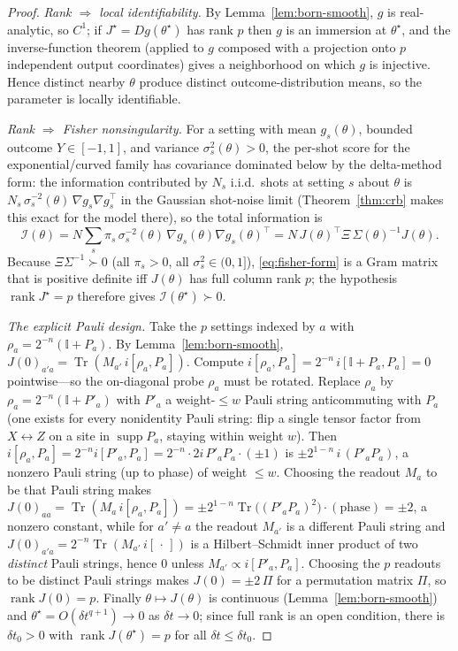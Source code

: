 \documentclass[aps,prresearch,reprint,superscriptaddress,nofootinbib,amsmath,amssymb]{revtex4-2}
\newcommand{\Tr}{\operatorname{Tr}}
\newcommand{\supp}{\operatorname{supp}}
\newcommand{\id}{\mathbb{I}}
\newcommand{\dt}{\delta t}
\begin{document}
\begin{proof}
\emph{Rank $\Rightarrow$ local identifiability.} By Lemma~\ref{lem:born-smooth}, $g$ is real-analytic, so $C^1$; if $J^\star=Dg(\theta^\star)$ has rank $p$ then $g$ is an immersion at $\theta^\star$, and the inverse-function theorem (applied to $g$ composed with a projection onto $p$ independent output coordinates) gives a neighborhood on which $g$ is injective. Hence distinct nearby $\theta$ produce distinct outcome-distribution means, so the parameter is locally identifiable.

\emph{Rank $\Rightarrow$ Fisher nonsingularity.} For a setting with mean $g_s(\theta)$, bounded outcome $Y\in[-1,1]$, and variance $\sigma_s^2(\theta)>0$, the per-shot score for the exponential/curved family has covariance dominated below by the delta-method form: the information contributed by $N_s$ i.i.d.\ shots at setting $s$ about $\theta$ is $N_s\,\sigma_s^{-2}(\theta)\,\nabla g_s\nabla g_s^\top$ in the Gaussian shot-noise limit (Theorem~\ref{thm:crb} makes this exact for the model there), so the total information is
\begin{equation}
    \mathcal{I}(\theta)=N\sum_{s}\pi_s\,\sigma_s^{-2}(\theta)\,\nabla g_s(\theta)\nabla g_s(\theta)^\top=N\,J(\theta)^\top\Xi\,\Sigma(\theta)^{-1}J(\theta).
    \label{eq:fisher-form}
\end{equation}
Because $\Xi\Sigma^{-1}\succ0$ (all $\pi_s>0$, all $\sigma_s^2\in(0,1]$), \eqref{eq:fisher-form} is a Gram matrix that is positive definite iff $J(\theta)$ has full column rank $p$; the hypothesis $\operatorname{rank}J^\star=p$ therefore gives $\mathcal{I}(\theta^\star)\succ0$.

\emph{The explicit Pauli design.} Take the $p$ settings indexed by $a$ with $\rho_a=2^{-n}(\id+P_a)$. By Lemma~\ref{lem:born-smooth}, $J(0)_{a'a}=\Tr(M_{a'}\,i[\rho_a,P_a])$. Compute $i[\rho_a,P_a]=2^{-n}\,i[\id+P_a,P_a]=0$ pointwise---so the on-diagonal probe $\rho_a$ must be rotated. Replace $\rho_a$ by $\rho_a=2^{-n}(\id+P'_a)$ with $P'_a$ a weight-$\leq w$ Pauli string anticommuting with $P_a$ (one exists for every nonidentity Pauli string: flip a single tensor factor from $X\!\leftrightarrow\!Z$ on a site in $\supp P_a$, staying within weight $w$). Then $i[\rho_a,P_a]=2^{-n}i[P'_a,P_a]=2^{-n}\cdot2i\,P'_aP_a\cdot(\pm1)$ is $\pm2^{1-n}\,i\,(P'_aP_a)$, a nonzero Pauli string (up to phase) of weight $\leq w$. Choosing the readout $M_a$ to be that Pauli string makes $J(0)_{aa}=\Tr(M_a\,i[\rho_a,P_a])=\pm2^{1-n}\Tr\bigl((P'_aP_a)^2\bigr)\cdot(\text{phase})=\pm2$, a nonzero constant, while for $a'\neq a$ the readout $M_{a'}$ is a different Pauli string and $J(0)_{a'a}=2^{-n}\Tr(M_{a'}\,i[\,\cdot\,])$ is a Hilbert--Schmidt inner product of two \emph{distinct} Pauli strings, hence $0$ unless $M_{a'}\propto i[P'_a,P_a]$. Choosing the $p$ readouts to be distinct Pauli strings makes $J(0)=\pm2\,\Pi$ for a permutation matrix $\Pi$, so $\operatorname{rank}J(0)=p$. Finally $\theta\mapsto J(\theta)$ is continuous (Lemma~\ref{lem:born-smooth}) and $\theta^\star=O(\dt^{q+1})\to0$ as $\dt\to0$; since full rank is an open condition, there is $\dt_0>0$ with $\operatorname{rank}J(\theta^\star)=p$ for all $\dt\leq\dt_0$.
\end{proof}
\end{document}
